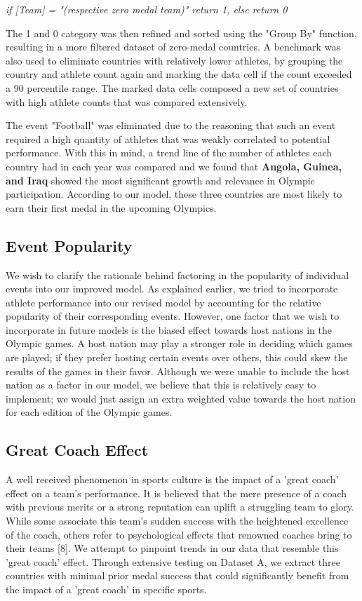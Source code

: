 \documentclass{mcmthesis}
\begin{document}
\par
\textit{if [Team] = "(respective zero medal team)" return 1,
        else return 0} \par

The 1 and 0 category was then refined and sorted using the "Group By" function, resulting in a more filtered dataset of zero-medal countries. A benchmark was also used to eliminate countries with relatively lower athletes, by grouping the country and athlete count again and marking the data cell if the count exceeded a 90 percentile range. The marked data cells composed a new set of countries with high athlete counts that was compared extensively.
\par
The event "Football" was eliminated due to the reasoning that such an event required a high quantity of athletes that was weakly correlated to potential performance. With this in mind, a trend line of the number of athletes each country had in each year was compared and we found that \textbf {Angola, Guinea, and Iraq} showed the most significant growth and relevance in Olympic participation. According to our model, these three countries are most likely to earn their first medal in the upcoming Olympics.  
\subsection{Event Popularity} 
We wish to clarify the rationale behind factoring in the popularity of individual events into our improved model. As explained earlier, we tried to incorporate athlete performance into our revised model by accounting for the relative popularity of their corresponding events. However, one factor that we wish to incorporate in future models is the biased effect towards host nations in the Olympic games. A host nation may play a stronger role in deciding which games are played; if they prefer hosting certain events over others, this could skew the results of the games in their favor. Although we were unable to include the host nation as a factor in our model, we believe that this is relatively easy to implement; we would just assign an extra weighted value towards the host nation for each edition of the Olympic games. 

\subsection{Great Coach Effect} 

A well received phenomenon in sports culture is the impact of a 'great coach' effect on a team's performance. It is believed that the mere presence of a coach with previous merits or a strong reputation can uplift a struggling team to glory. While some associate this team's sudden success with the heightened excellence of the coach, others refer to psychological effects that renowned coaches bring to their teams [8]. We attempt to pinpoint trends in our data that resemble this 'great coach' effect. Through extensive testing on Dataset A, we extract three countries with minimal prior medal success that could significantly benefit from the impact of a 'great coach' in specific sports.
\end{document}
